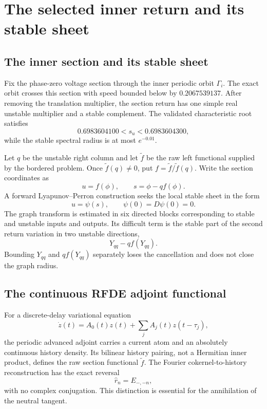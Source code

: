\section{The selected inner return and its stable sheet}\label{sec:inner-return}
\subsection{The inner section and its stable sheet}

Fix the phase-zero voltage section through the inner periodic orbit
\(\Gamma_i\).  The exact orbit crosses this section with speed bounded below
by \(0.2067539137\).  After removing the translation multiplier, the
section return has one simple real unstable multiplier and a stable
complement.  The validated characteristic root satisfies
\begin{equation}
 0.6983604100<s_u<0.6983604300,                         \label{eq:inner-unstable-root}
\end{equation}
while the stable spectral radius is at most \(e^{-0.01}\).

Let \(q\) be the unstable right column and let \(\widetilde f\) be the raw
left functional supplied by the bordered problem.  Once
\(\widetilde f(q)\ne0\), put
\(f=\widetilde f/\widetilde f(q)\).  Write the section coordinates as
\[
 u=f(\phi),\qquad s=\phi-qf(\phi).
\]
A forward Lyapunov--Perron construction seeks the local stable sheet in the
form
\begin{equation}
 u=\psi(s),\qquad \psi(0)=D\psi(0)=0.                  \label{eq:stable-graph}
\end{equation}
The graph transform is estimated in six directed blocks corresponding to
stable and unstable inputs and outputs.  Its difficult term is the stable
part of the second return variation in two unstable directions,
\[
 Y_{qq}-qf(Y_{qq}).
\]
Bounding \(Y_{qq}\) and \(qf(Y_{qq})\) separately loses the cancellation and
does not close the graph radius.

\subsection{The continuous RFDE adjoint functional}

For a discrete-delay variational equation
\[
 \dot z(t)=A_0(t)z(t)+\sum_j A_j(t)z(t-\tau_j),
\]
the periodic advanced adjoint carries a current atom and an absolutely
continuous history density.  Its bilinear history pairing, not a Hermitian
inner product, defines the raw section functional \(\widetilde f\).  The Fourier
cokernel-to-history reconstruction has the exact reversal
\begin{equation}
 \widehat r_n=E_{-,-n},                                \label{eq:fourier-reversal}
\end{equation}
with no complex conjugation.  This distinction is essential for the
annihilation of the neutral tangent.


